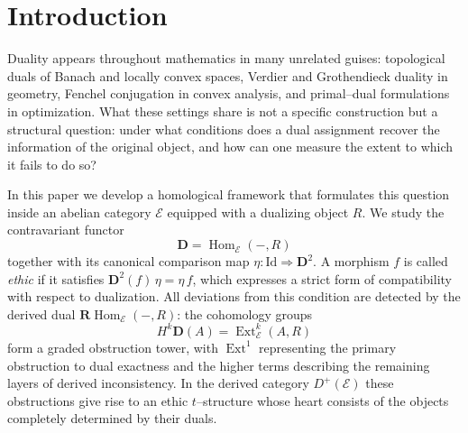 \documentclass[12pt]{article}
\newcommand{\Id}{\mathrm{Id}}
\newcommand{\E}{\mathcal{E}}
\newcommand{\Hom}{\operatorname{Hom}}
\newcommand{\Ext}{\operatorname{Ext}}
\newcommand{\RHom}{\mathbf{R}\!\operatorname{Hom}}
\theoremstyle{plain}
\theoremstyle{definition}
\theoremstyle{remark}
\numberwithin{equation}{section}
\begin{document}



\tableofcontents

\section*{Introduction}

Duality appears throughout mathematics in many unrelated guises: topological
duals of Banach and locally convex spaces, Verdier and Grothendieck duality in
geometry, Fenchel conjugation in convex analysis, and primal--dual formulations
in optimization.  What these settings share is not a specific construction but a
structural question: under what conditions does a dual assignment recover the
information of the original object, and how can one measure the extent to which
it fails to do so?

In this paper we develop a homological framework that formulates this question
inside an abelian category $\E$ equipped with a dualizing object $R$.  We study
the contravariant functor
\[
\mathbf D = \Hom_\E(-,R)
\]
together with its canonical comparison map $\eta : \Id \Rightarrow \mathbf D^2$.
A morphism $f$ is called \emph{ethic} if it satisfies
$\mathbf D^2(f)\,\eta=\eta\,f$, which expresses a strict form of compatibility
with respect to dualization.  All deviations from this condition are detected by
the derived dual $\RHom_\E(-,R)$: the cohomology groups
\[
H^k\mathbf D(A)=\Ext^k_\E(A,R)
\]
form a graded obstruction tower, with $\Ext^1$ representing the primary
obstruction to dual exactness and the higher terms describing the remaining
layers of derived inconsistency.  In the derived category $D^+(\E)$ these
obstructions give rise to an ethic $t$--structure whose heart consists of the
objects completely determined by their duals.
\end{document}
